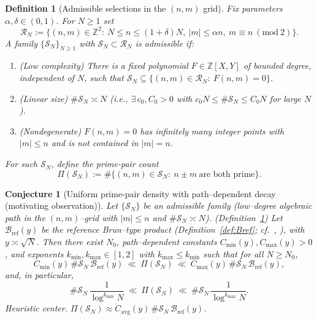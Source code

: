 \documentclass[11pt]{article}
\theoremstyle{inline}
\theoremstyle{break}
\theoremstyle{break}
\theoremstyle{break}
\theoremstyle{break}
\theoremstyle{break}
\newtheorem{conjecture}{Conjecture}
\theoremstyle{break}
\theoremstyle{break}
\newtheorem{definition}{Definition}
\theoremstyle{inline}
\newcommand{\tavg}{{\scriptscriptstyle\mathrm{avg}}}
\newcommand{\tref}{{\scriptscriptstyle\mathrm{ref}}}
\newcommand{\Cpred}{\mathring{C}}   %
\newcommand{\Bref}{\mathcal{B}_\tref}
\begin{document}
\begin{definition}[Admissible selections in the \( (n,m) \) grid]
\label{def:admissible}
Fix parameters \( \alpha,\delta\in(0,1) \). For \( N\ge 1 \) set
\begin{equation}
\mathcal{R}_N:=\{(n,m)\in\mathbb{Z}^2:\ N\le n\le (1+\delta)N,\ |m|\le \alpha n,\ m\equiv n \ (\mathrm{mod}\ 2)\}.
\end{equation}
A family \( \{\mathcal{S}_N\}_{N\ge 1} \) with \( \mathcal{S}_N\subset\mathcal{R}_N \) is \emph{admissible} if:
\begin{enumerate}
\item[(A1)] (\emph{Low complexity}) There is a fixed polynomial \( F\in\mathbb{Z}[X,Y] \) of bounded degree, independent of \( N \), such that
\( \mathcal{S}_N \subseteq \{(n,m)\in\mathcal{R}_N:\ F(n,m)=0\} \).
\item[(A2)] (\emph{Linear size}) \( \#\mathcal{S}_N \asymp N \) (i.e., \( \exists\,c_0,C_0>0 \) with \( c_0 N\le \#\mathcal{S}_N\le C_0 N \) for large \( N \)).
\item[(A3)] (\emph{Nondegenerate}) \( F(n,m)=0 \) has infinitely many integer points with \( |m|\le n \) and is not contained in \( |m|=n \).
\end{enumerate}
For such \( \mathcal{S}_N \), define the prime-pair count
\begin{equation}
\Pi(\mathcal{S}_N):=\#\{(n,m)\in\mathcal{S}_N:\ n\pm m\ \text{are both prime}\}.
\end{equation}
\end{definition}

\begin{conjecture}[Uniform prime-pair density with path–dependent decay (motivating observation)]\label{conj:uniform-C}
Let \( \{\mathcal{S}_N\} \) be an admissible family (low–degree algebraic path in the \( (n,m) \)–grid with \( |m|\le n \) and \( \#\mathcal{S}_N\asymp N \)).  (Definition~\ref{def:admissible})
Let \( \Bref(y) \) be the reference Brun–type product
(Definition~\ref{def:Bref}; cf.~\cite[§1.6]{HalberstamRichert1974}, \cite[Ch.~4]{Riesel1994}),
with \( y\asymp\sqrt{N} \).
Then there exist \( N_0 \), path–dependent constants \( C_{\min}(y),C_{\max}(y)>0 \), and exponents
\( k_{\min},k_{\max}\in[1,2] \) with \( k_{\max} \le k_{\min} \) such that for all \( N\ge N_0 \),
\begin{equation}
C_{\min}(y)\,\#\mathcal{S}_N\,\Bref(y)
\ \ll\
\Pi(\mathcal{S}_N)
\ \ll\
C_{\max}(y)\,\#\mathcal{S}_N\,\Bref(y),
\end{equation}
and, in particular,
\begin{equation}
\#\mathcal{S}_N\,\frac{1}{\log^{k_{\min}} N}
\ \ll\
\Pi(\mathcal{S}_N)
\ \ll\
\#\mathcal{S}_N\,\frac{1}{\log^{k_{\max}} N}.
\end{equation}
\emph{Heuristic center.}\quad
\( \Pi(\mathcal{S}_N)\approx \Cpred_\tavg(y)\,\#\mathcal{S}_N\,\Bref(y) \).
\end{conjecture}
\end{document}
